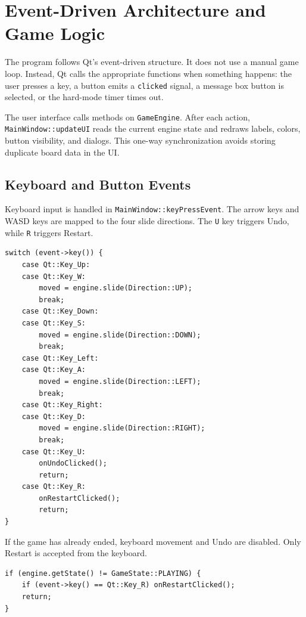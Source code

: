 \documentclass[a4paper,12pt]{article}
\begin{document}
\section{Event-Driven Architecture and Game Logic}

The program follows Qt's event-driven structure. It does not use a manual game loop. Instead, Qt calls the appropriate functions when something happens: the user presses a key, a button emits a \texttt{clicked} signal, a message box button is selected, or the hard-mode timer times out.

The user interface calls methods on \texttt{GameEngine}. After each action, \texttt{MainWindow::updateUI} reads the current engine state and redraws labels, colors, button visibility, and dialogs. This one-way synchronization avoids storing duplicate board data in the UI.

\subsection{Keyboard and Button Events}

Keyboard input is handled in \texttt{MainWindow::keyPressEvent}. The arrow keys and WASD keys are mapped to the four slide directions. The \texttt{U} key triggers Undo, while \texttt{R} triggers Restart.

\begin{lstlisting}[style=CppStyle,caption={Keyboard mapping for movement and shortcuts}]
switch (event->key()) {
    case Qt::Key_Up:
    case Qt::Key_W:
        moved = engine.slide(Direction::UP);
        break;
    case Qt::Key_Down:
    case Qt::Key_S:
        moved = engine.slide(Direction::DOWN);
        break;
    case Qt::Key_Left:
    case Qt::Key_A:
        moved = engine.slide(Direction::LEFT);
        break;
    case Qt::Key_Right:
    case Qt::Key_D:
        moved = engine.slide(Direction::RIGHT);
        break;
    case Qt::Key_U:
        onUndoClicked();
        return;
    case Qt::Key_R:
        onRestartClicked();
        return;
}
\end{lstlisting}

If the game has already ended, keyboard movement and Undo are disabled. Only Restart is accepted from the keyboard.

\begin{lstlisting}[style=CppStyle,caption={Input restriction after the game ends}]
if (engine.getState() != GameState::PLAYING) {
    if (event->key() == Qt::Key_R) onRestartClicked();
    return;
}
\end{lstlisting}
\end{document}
